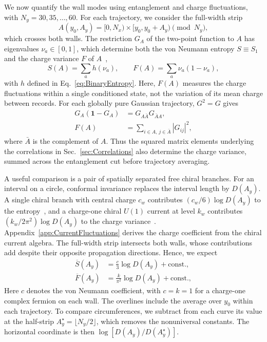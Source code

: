 \documentclass[aps,prb,10pt,twocolumn,superscriptaddress,longbibliography,floatfix]{revtex4-2}
\newcommand{\newtext}[1]{{\color{blue}#1}}
\begin{document}
{\color{blue}
We now quantify the wall modes using entanglement and charge fluctuations, with $N_y=30,35,\ldots,60$. For each trajectory, we consider the full-width strip
\begin{equation}
    A(y_0,A_y)=[0,N_x)\times[y_0,y_0+A_y)\pmod{N_y},
    \label{eq:Strip}
\end{equation}
which crosses both walls. The restriction $G_A$ of the two-point function to $A$ has eigenvalues $\nu_a\in[0,1]$, which determine both the von Neumann entropy $S\equiv S_1$ and the charge variance $F$ of $A$~\cite{KlichLevitov2009,SongFlindtRachel2011},
\begin{equation}
    S(A)=\sum_a h(\nu_a),
    \qquad
    F(A)=\sum_a\nu_a(1-\nu_a),
    \label{eq:EntropyVariance}
\end{equation}
\newtext{with $h$ defined in Eq.~\eqref{eq:BinaryEntropy}.}
Here, $F(A)$ measures the charge fluctuations within a single conditioned state, not the variation of its mean charge between records. For each globally pure Gaussian trajectory, $G^2=G$ gives
\begin{align}
 G_A(\mathbf{1}-G_A)&=G_{A\bar A}G_{\bar A A},\nonumber\\
 F(A)&=\sum_{i\in A,\,j\in\bar A}|G_{ij}|^2,
 \label{eq:VarianceCrossCut}
\end{align}
where $\bar A$ is the complement of $A$. Thus the squared matrix elements underlying the correlations in Sec.~\ref{sec:Correlations} also determine the charge variance, summed across the entanglement cut before trajectory averaging.
}

{\color{blue}
\newtext{A useful comparison is a pair of spatially separated free chiral branches.} For an interval on a circle, conformal invariance replaces the interval length by $D(A_y)$. A single chiral branch with central charge $c_w$ contributes $(c_w/6)\log D(A_y)$ to the entropy~\cite{CalabreseCardy2004}, and a charge-one chiral $U(1)$ current at level $k_w$ contributes $(k_w/2\pi^2)\log D(A_y)$ to the charge variance~\cite{DiFrancescoMathieuSenechal1997}. Appendix~\ref{app:CurrentFluctuations} derives the charge coefficient from the chiral current algebra. The full-width strip intersects both walls, whose contributions add despite their opposite propagation directions. Hence, we expect
\begin{align}
    \overline{S}(A_y)&=\frac{c}{3}\log D(A_y)+\text{const.},\nonumber\\
    \overline{F}(A_y)&=\frac{k}{\pi^2}\log D(A_y)+\text{const.},
    \label{eq:CFTScaling}
\end{align}
\newtext{Here $c$ denotes the von Neumann coefficient, with $c=k=1$ for a charge-one complex fermion on each wall.} \newtext{The overlines include the average over $y_0$ within each trajectory.} To compare circumferences, we subtract from each curve its value at the half-strip $A_y^\star=\lfloor N_y/2\rfloor$, which removes the nonuniversal constants. The horizontal coordinate is then $\log[D(A_y)/D(A_y^\star)]$.
}
\end{document}
